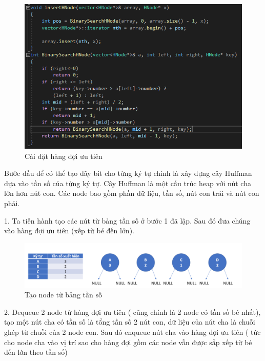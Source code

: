 \documentclass[14pt]{extreport}
\begin{document}
\begin{center}
    \begin{figure}[H]
    \begin{center}
     \includegraphics[scale=1.]{priority_queue.PNG}
    \end{center}
    \caption{Cài đặt hàng đợi ưu tiên}
    \label{refhinh1}
    \end{figure}
\end{center}

Bước đầu để có thể tạo dãy bit cho từng ký tự chính là xây dựng cây Huffman dựa vào tần số của từng ký tự. Cây Huffman là một cấu trúc heap với nút cha lớn hơn nút con. Các node bao gồm phần dữ liệu, tần số, nút con trái và nút con phải.

1. Ta tiến hành tạo các nút từ bảng tần số ở bước 1 đã lập. Sau đó đưa chúng vào hàng đợi ưu tiên (xếp từ bé đến lớn).

\begin{center}
    \begin{figure}[H]
    \begin{center}
     \includegraphics[scale=0.65]{createNode.PNG}
    \end{center}
    \caption{Tạo node từ bảng tần số}
    \label{refhinh1}
    \end{figure}
\end{center}

2. Dequeue 2 node từ hàng đợi ưu tiên ( cũng chính là 2 node có tần số bé nhất), tạo một nút cha có tần số là tổng tần số 2 nút con, dữ liệu của nút cha là chuỗi ghép từ chuỗi của 2 node con. Sau đó enqueue nút cha vào hàng đợi ưu tiên ( tức cho node cha vào vị trí sao cho hàng đợi gồm các node vẫn được sắp xếp từ bé đến lớn theo tần số)
\end{document}
